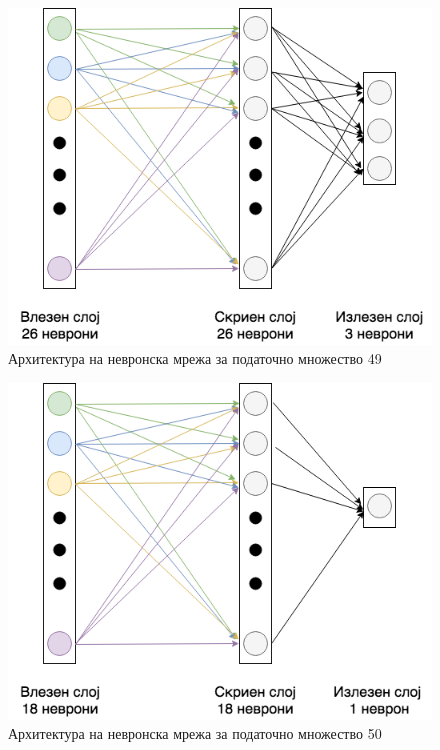 \begin{figure}[H]
\centering
\includegraphics[scale=0.34]{images/Neural_net_49.png}
\caption{Архитектура на невронска мрежа за податочно множество 49}
\label{fig:architecture_49}
\centering
\end{figure}

\begin{figure}[H]
\centering
\includegraphics[scale=0.34]{images/Neural_net_50.png}
\caption{Архитектура на невронска мрежа за податочно множество 50}
\label{fig:architecture_50}
\centering
\end{figure}


